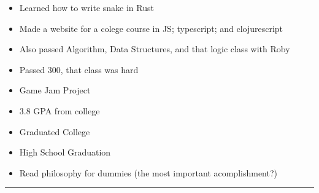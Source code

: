 \documentclass[letterpaper,11pt]{article}
\newcommand{\resumeItem}[1]{
  \item\small{
    {#1 \vspace{-2pt}}
  }
}
\newcommand{\resumeItemListStart}{\begin{itemize}}
\newcommand{\resumeItemListEnd}{\end{itemize}\vspace{-5pt}}
\begin{document}
\resumeItemListStart
\resumeItem{ Learned how to write snake in Rust }
\resumeItemListEnd

\resumeItemListStart
\resumeItem{ Made a website for a colege course in JS;
	typescript; and clojurescript }
\resumeItemListEnd

\resumeItemListStart
\resumeItem{ Also passed Algorithm, Data Structures, and that logic class with Roby }
\resumeItemListEnd

\resumeItemListStart
\resumeItem{ Passed 300, that class was hard }
\resumeItemListEnd

\resumeItemListStart
\resumeItem{ Game Jam Project }
\resumeItemListEnd

\resumeItemListStart
\resumeItem{ 3.8 GPA from college }
\resumeItemListEnd


\resumeItemListStart
\resumeItem{ Graduated College }
\resumeItemListEnd

\resumeItemListStart
\resumeItem{ High School Graduation }
\resumeItemListEnd

\resumeItemListStart
\resumeItem{ Read philosophy for dummies (the most important acomplishment?) }
\resumeItemListEnd

\noindent\rule{19.5cm}{0.4pt}
\end{document}
